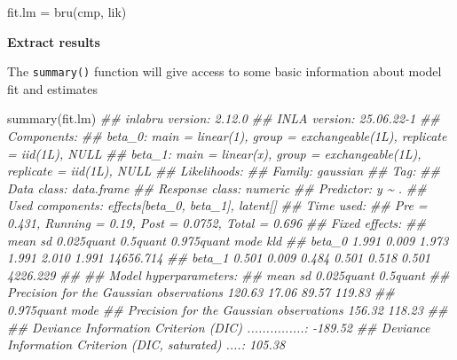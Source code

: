 \documentclass[
  letterpaper,
  DIV=11,
  numbers=noendperiod]{scrartcl}
\newenvironment{Shaded}{\begin{snugshade}}{\end{snugshade}}
\newcommand{\DocumentationTok}[1]{\textcolor[rgb]{0.37,0.37,0.37}{\textit{#1}}}
\newcommand{\FunctionTok}[1]{\textcolor[rgb]{0.28,0.35,0.67}{#1}}
\newcommand{\NormalTok}[1]{\textcolor[rgb]{0.00,0.23,0.31}{#1}}
\newcommand{\OtherTok}[1]{\textcolor[rgb]{0.00,0.23,0.31}{#1}}
\begin{document}
\begin{Shaded}
\begin{Highlighting}[]
\NormalTok{fit.lm }\OtherTok{=} \FunctionTok{bru}\NormalTok{(cmp, lik)}
\end{Highlighting}
\end{Shaded}

\textbf{Extract results}

The \texttt{summary()} function will give access to some basic
information about model fit and estimates

\begin{Shaded}
\begin{Highlighting}[]
\FunctionTok{summary}\NormalTok{(fit.lm)}
\DocumentationTok{\#\# inlabru version: 2.12.0}
\DocumentationTok{\#\# INLA version: 25.06.22{-}1}
\DocumentationTok{\#\# Components:}
\DocumentationTok{\#\# beta\_0: main = linear(1), group = exchangeable(1L), replicate = iid(1L), NULL}
\DocumentationTok{\#\# beta\_1: main = linear(x), group = exchangeable(1L), replicate = iid(1L), NULL}
\DocumentationTok{\#\# Likelihoods:}
\DocumentationTok{\#\#   Family: \textquotesingle{}gaussian\textquotesingle{}}
\DocumentationTok{\#\#     Tag: \textquotesingle{}\textquotesingle{}}
\DocumentationTok{\#\#     Data class: \textquotesingle{}data.frame\textquotesingle{}}
\DocumentationTok{\#\#     Response class: \textquotesingle{}numeric\textquotesingle{}}
\DocumentationTok{\#\#     Predictor: y \textasciitilde{} .}
\DocumentationTok{\#\#     Used components: effects[beta\_0, beta\_1], latent[]}
\DocumentationTok{\#\# Time used:}
\DocumentationTok{\#\#     Pre = 0.431, Running = 0.19, Post = 0.0752, Total = 0.696 }
\DocumentationTok{\#\# Fixed effects:}
\DocumentationTok{\#\#         mean    sd 0.025quant 0.5quant 0.975quant  mode       kld}
\DocumentationTok{\#\# beta\_0 1.991 0.009      1.973    1.991      2.010 1.991 14656.714}
\DocumentationTok{\#\# beta\_1 0.501 0.009      0.484    0.501      0.518 0.501  4226.229}
\DocumentationTok{\#\# }
\DocumentationTok{\#\# Model hyperparameters:}
\DocumentationTok{\#\#                                           mean    sd 0.025quant 0.5quant}
\DocumentationTok{\#\# Precision for the Gaussian observations 120.63 17.06      89.57   119.83}
\DocumentationTok{\#\#                                         0.975quant   mode}
\DocumentationTok{\#\# Precision for the Gaussian observations     156.32 118.23}
\DocumentationTok{\#\# }
\DocumentationTok{\#\# Deviance Information Criterion (DIC) ...............: {-}189.52}
\DocumentationTok{\#\# Deviance Information Criterion (DIC, saturated) ....: 105.38}

\end{Highlighting}
\end{Shaded}
\end{document}

